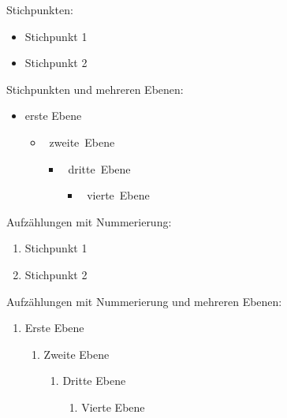 Stichpunkten: 
\begin{itemize}
    \item Stichpunkt 1
    \item Stichpunkt 2
\end{itemize}

Stichpunkten und mehreren Ebenen:
\begin{itemize}
\item erste Ebene
\begin{itemize}
\item zweite Ebene
\begin{itemize}
\item dritte Ebene
\begin{itemize}
\item vierte Ebene
\end{itemize}
\end{itemize}
\end{itemize}
\end{itemize}


Aufzählungen mit Nummerierung: 
\begin{enumerate}
    \item Stichpunkt 1
    \item Stichpunkt 2
\end{enumerate}

Aufzählungen mit Nummerierung und mehreren Ebenen:
\begin{enumerate}
    \item Erste Ebene
    \begin{enumerate}
        \item Zweite Ebene
        \begin{enumerate}
            \item Dritte Ebene
            \begin{enumerate}
                \item Vierte Ebene
            \end{enumerate}
        \end{enumerate}
    \end{enumerate}
\end{enumerate}

